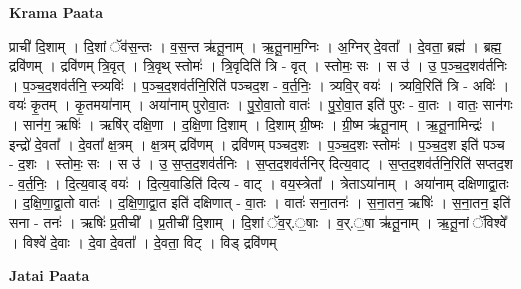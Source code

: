 \documentclass[17pt]{extarticle}
\begin{document}
\textbf{Krama Paata} \newline

प्राची॑ दि॒शाम् । दि॒शां ॅव॑स॒न्तः । व॒स॒न्त ऋ॑तू॒नाम् । ऋ॒तू॒नाम॒ग्निः । अ॒ग्निर् दे॒वता᳚ । दे॒वता॒ ब्रह्म॑ । ब्रह्म॒ द्रवि॑णम् । द्रवि॑णम् त्रि॒वृत् । त्रि॒वृथ् स्तोमः॑ । त्रि॒वृदिति॑ त्रि - वृत् । स्तोमः॒ सः । स उ॑ । उ॒ प॒ञ्च॒द॒शव॑र्तनिः । प॒ञ्च॒द॒शव॑र्तनि॒ स्त्र्यविः॑ । प॒ञ्च॒द॒शव॑र्तनि॒रिति॑ पञ्चद॒श - व॒र्त॒निः॒ । त्र्यवि॒र् वयः॑ । त्र्यवि॒रिति॑ त्रि - अविः॑ । वयः॑ कृ॒तम् । कृ॒तमया॑नाम् । अया॑नाम् पुरोवा॒तः । पु॒रो॒वा॒तो वातः॑ । पु॒रो॒वा॒त इति॑ पुरः - वा॒तः । वातः॒ सान॑गः । सान॑ग॒ ऋषिः॑ । ऋषि॑र् दक्षि॒णा । द॒क्षि॒णा दि॒शाम् । दि॒शाम् ग्री॒ष्मः । ग्री॒ष्म ऋ॑तू॒नाम् । ऋ॒तू॒नामिन्द्रः॑ । इन्द्रो॑ दे॒वता᳚ । दे॒वता᳚ क्ष॒त्रम् । क्ष॒त्रम् द्रवि॑णम् । द्रवि॑णम् पञ्चद॒शः । प॒ञ्च॒द॒शः स्तोमः॑ । प॒ञ्च॒द॒श इति॑ पञ्च - द॒शः । स्तोमः॒ सः । स उ॑ । उ॒ स॒प्त॒द॒शव॑र्तनिः । स॒प्त॒द॒शव॑र्तनिर् दित्य॒वाट् । स॒प्त॒द॒शव॑र्तनि॒रिति॑ सप्तद॒श - व॒र्त॒निः॒ । दि॒त्य॒वाड् वयः॑ । दि॒त्य॒वाडिति॑ दित्य - वाट् । वय॒स्त्रेता᳚ । त्रेताऽया॑नाम् । अया॑नाम् दक्षिणाद्वा॒तः । द॒क्षि॒णा॒द्वा॒तो वातः॑ । द॒क्षि॒णा॒द्वा॒त इति॑ दक्षिणात् - वा॒तः । वातः॑ सना॒तनः॑ । स॒ना॒तन॒ ऋषिः॑ । स॒ना॒तन॒ इति॑ सना - तनः॑ । ऋषिः॑ प्र॒तीची᳚ । प्र॒तीची॑ दि॒शाम् । दि॒शां ॅव॒र्.॒षाः । व॒र्.॒षा ऋ॑तू॒नाम् । ऋ॒तू॒नां ॅविश्वे᳚ । विश्वे॑ दे॒वाः । दे॒वा दे॒वता᳚ । दे॒वता॒ विट् । विड् द्रवि॑णम् \newline

\textbf{Jatai Paata} \newline
\end{document}
